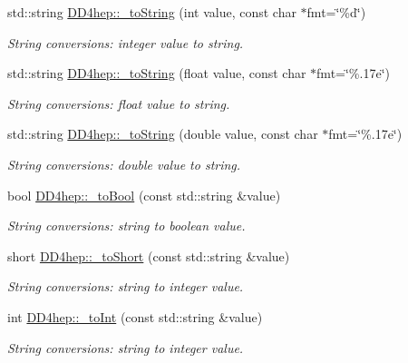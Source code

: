\begin{DoxyCompactItemize}
std::string \hyperlink{group___d_d4_h_e_p___g_e_o_m_e_t_r_y_ga7c5be2d7907e4e1d8ce7a2396b10b695}{DD4hep::\_\-toString} (int value, const char $\ast$fmt=\char`\"{}\%d\char`\"{})
\begin{DoxyCompactList}\small\item\em String conversions: integer value to string. \item\end{DoxyCompactList}\item 
std::string \hyperlink{group___d_d4_h_e_p___g_e_o_m_e_t_r_y_ga0ade5df64f54ccda654522ce830b3c15}{DD4hep::\_\-toString} (float value, const char $\ast$fmt=\char`\"{}\%.17e\char`\"{})
\begin{DoxyCompactList}\small\item\em String conversions: float value to string. \item\end{DoxyCompactList}\item 
std::string \hyperlink{group___d_d4_h_e_p___g_e_o_m_e_t_r_y_ga4e976c2563bd851ad9569c4a9c28d73a}{DD4hep::\_\-toString} (double value, const char $\ast$fmt=\char`\"{}\%.17e\char`\"{})
\begin{DoxyCompactList}\small\item\em String conversions: double value to string. \item\end{DoxyCompactList}\item 
bool \hyperlink{group___d_d4_h_e_p___g_e_o_m_e_t_r_y_ga57c16649c26dda84c503948b57737b47}{DD4hep::\_\-toBool} (const std::string \&value)
\begin{DoxyCompactList}\small\item\em String conversions: string to boolean value. \item\end{DoxyCompactList}\item 
short \hyperlink{group___d_d4_h_e_p___g_e_o_m_e_t_r_y_gaef47a03e8cfb41d0bc2d598c16b7b9f2}{DD4hep::\_\-toShort} (const std::string \&value)
\begin{DoxyCompactList}\small\item\em String conversions: string to integer value. \item\end{DoxyCompactList}\item 
int \hyperlink{group___d_d4_h_e_p___g_e_o_m_e_t_r_y_ga6222fc401a48bcb4a2c176291bf4821b}{DD4hep::\_\-toInt} (const std::string \&value)
\begin{DoxyCompactList}\small\item\em String conversions: string to integer value. \item\end{DoxyCompactList}\item 

\end{DoxyCompactItemize}

